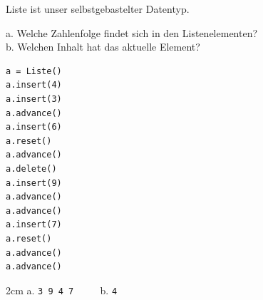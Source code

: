 \question[3]
Liste ist unser selbstgebastelter Datentyp.

a. Welche Zahlenfolge findet sich in den Listenelementen? \\
b. Welchen Inhalt hat das aktuelle Element? 
\begin{lstlisting}
a = Liste()
a.insert(4)
a.insert(3)
a.advance()
a.insert(6)
a.reset()
a.advance()
a.delete()
a.insert(9)
a.advance()
a.advance()
a.insert(7)
a.reset()
a.advance()
a.advance()
\end{lstlisting}

\begin{solutionbox}{2cm}
a. \texttt{3 9 4 7} ~~~~ b. \texttt{4}
\end{solutionbox}
